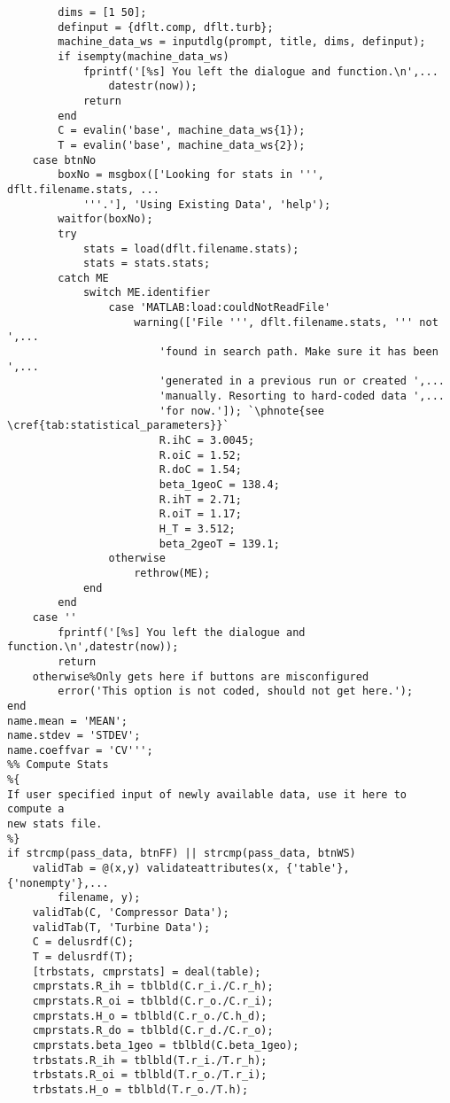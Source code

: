 \begin{lstlisting}
        dims = [1 50];
        definput = {dflt.comp, dflt.turb};
        machine_data_ws = inputdlg(prompt, title, dims, definput);
        if isempty(machine_data_ws)
            fprintf('[%s] You left the dialogue and function.\n',...
                datestr(now));
            return
        end
        C = evalin('base', machine_data_ws{1});
        T = evalin('base', machine_data_ws{2});
    case btnNo
        boxNo = msgbox(['Looking for stats in ''', dflt.filename.stats, ...
            '''.'], 'Using Existing Data', 'help');
        waitfor(boxNo);
        try
            stats = load(dflt.filename.stats);
            stats = stats.stats;
        catch ME
            switch ME.identifier
                case 'MATLAB:load:couldNotReadFile'
                    warning(['File ''', dflt.filename.stats, ''' not ',...
                        'found in search path. Make sure it has been ',...
                        'generated in a previous run or created ',...
                        'manually. Resorting to hard-coded data ',...
                        'for now.']); `\phnote{see \cref{tab:statistical_parameters}}`
                        R.ihC = 3.0045;
                        R.oiC = 1.52;
                        R.doC = 1.54;
                        beta_1geoC = 138.4;
                        R.ihT = 2.71;
                        R.oiT = 1.17;
                        H_T = 3.512;
                        beta_2geoT = 139.1;
                otherwise
                    rethrow(ME);
            end
        end
    case ''
        fprintf('[%s] You left the dialogue and function.\n',datestr(now));
        return
    otherwise%Only gets here if buttons are misconfigured
        error('This option is not coded, should not get here.');
end
name.mean = 'MEAN';
name.stdev = 'STDEV';
name.coeffvar = 'CV''';
%% Compute Stats
%{
If user specified input of newly available data, use it here to compute a
new stats file.
%}
if strcmp(pass_data, btnFF) || strcmp(pass_data, btnWS)
    validTab = @(x,y) validateattributes(x, {'table'}, {'nonempty'},...
        filename, y);
    validTab(C, 'Compressor Data');
    validTab(T, 'Turbine Data');
    C = delusrdf(C);
    T = delusrdf(T);    
    [trbstats, cmprstats] = deal(table);    
    cmprstats.R_ih = tblbld(C.r_i./C.r_h);
    cmprstats.R_oi = tblbld(C.r_o./C.r_i);
    cmprstats.H_o = tblbld(C.r_o./C.h_d);
    cmprstats.R_do = tblbld(C.r_d./C.r_o);
    cmprstats.beta_1geo = tblbld(C.beta_1geo);    
    trbstats.R_ih = tblbld(T.r_i./T.r_h);
    trbstats.R_oi = tblbld(T.r_o./T.r_i);
    trbstats.H_o = tblbld(T.r_o./T.h);

\end{lstlisting}
